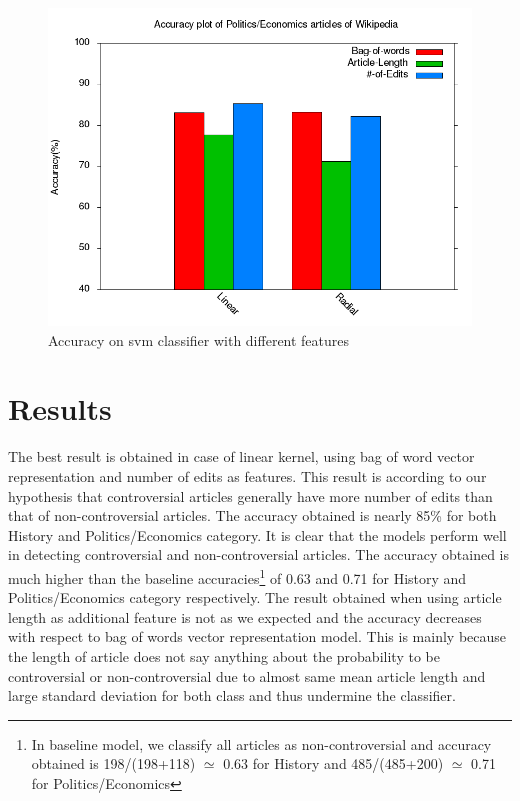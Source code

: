 \documentclass[twocolumn]{article}
\begin{document}
 \begin{figure}[t]
         \centering
         \includegraphics[width=0.95\columnwidth]{accuracy_plot2.png}
         \caption{Accuracy on svm classifier with different features}
         \label{fig:2}
 \end{figure}
 \section{Results}
 
 The best result is obtained in case of linear kernel, using bag of word
 vector representation and number of edits as features. This result is 
 according to our hypothesis that controversial articles generally have 
 more number of edits than that of non-controversial articles. The accuracy 
 obtained is nearly 85\% for both History and Politics/Economics category.
 It is clear that the models perform well in detecting controversial and 
 non-controversial articles. The accuracy obtained is much higher than the
 baseline accuracies\footnote{In baseline model, we classify
 all articles as non-controversial and accuracy obtained is 198/(198+118) 
 $\simeq$ 0.63 for History and 485/(485+200) $\simeq$ 0.71 for Politics/Economics}
 of 0.63 and 0.71 for History and Politics/Economics category respectively. The result obtained
 when using article length as additional feature is not as we expected 
 and the accuracy decreases with respect to bag of words vector representation 
 model. This is mainly because the length of article does not say anything 
 about the probability to be controversial or non-controversial due to 
 almost same mean article length and large standard deviation for both 
 class and thus undermine the classifier.
 
\end{document}
